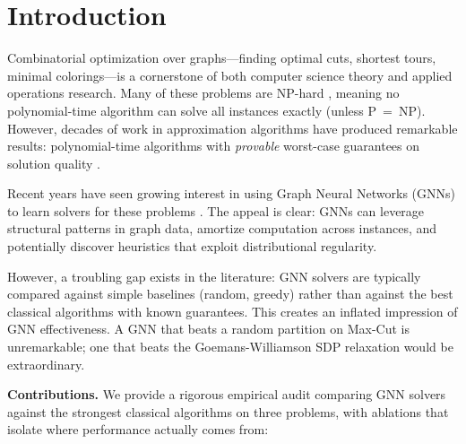 \documentclass[11pt]{article}
\begin{document}
\section{Introduction}

Combinatorial optimization over graphs---finding optimal cuts, shortest tours, minimal colorings---is a cornerstone of both computer science theory and applied operations research.
Many of these problems are NP-hard \cite{garey1979computers}, meaning no polynomial-time algorithm can solve all instances exactly (unless P~=~NP).
However, decades of work in approximation algorithms have produced remarkable results: polynomial-time algorithms with \emph{provable} worst-case guarantees on solution quality \cite{vazirani2001approximation}.

Recent years have seen growing interest in using Graph Neural Networks (GNNs) to learn solvers for these problems \cite{khalil2017learning, bengio2021machine, cappart2023combinatorial}.
The appeal is clear: GNNs can leverage structural patterns in graph data, amortize computation across instances, and potentially discover heuristics that exploit distributional regularity.

However, a troubling gap exists in the literature: GNN solvers are typically compared against simple baselines (random, greedy) rather than against the best classical algorithms with known guarantees.
This creates an inflated impression of GNN effectiveness.
A GNN that beats a random partition on Max-Cut is unremarkable; one that beats the Goemans-Williamson SDP relaxation \cite{goemans1995improved} would be extraordinary.

\textbf{Contributions.} We provide a rigorous empirical audit comparing GNN solvers against the strongest classical algorithms on three problems, with ablations that isolate where performance actually comes from:
\end{document}
